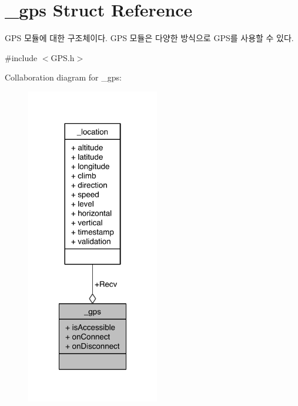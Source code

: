 \hypertarget{struct__gps}{\section{\-\_\-gps Struct Reference}
\label{struct__gps}
}


G\-P\-S 모듈에 대한 구조체이다. G\-P\-S 모듈은 다양한 방식으로 G\-P\-S를 사용할 수 있다.  




{\ttfamily \#include $<$G\-P\-S.\-h$>$}



Collaboration diagram for \-\_\-gps\-:\nopagebreak
\begin{figure}[H]
\begin{center}
\leavevmode
\includegraphics[width=164pt]{de/d66/struct__gps__coll__graph}
\end{center}
\end{figure}
